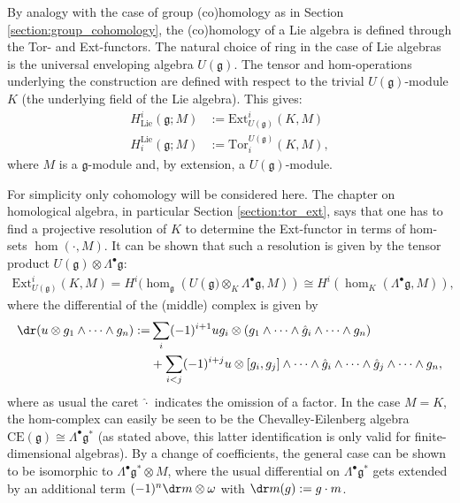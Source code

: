     By analogy with the case of group (co)homology as in Section \ref{section:group_cohomology}, the (co)homology of a Lie algebra is defined through the Tor- and Ext-functors. The natural choice of ring in the case of Lie algebras is the universal enveloping algebra $U(\mathfrak{g})$. The tensor and hom-operations underlying the construction are defined with respect to the trivial $U(\mathfrak{g})$-module $K$ (the underlying field of the Lie algebra). This gives:
    \begin{align}
        H^i_\mathrm{Lie}(\mathfrak{g};M) &:= \mathrm{Ext}^i_{U(\mathfrak{g})}(K,M)\\
        H_i^\mathrm{Lie}(\mathfrak{g};M) &:= \mathrm{Tor}_i^{U(\mathfrak{g})}(K,M),
    \end{align}
    where $M$ is a $\mathfrak{g}$-module and, by extension, a $U(\mathfrak{g})$-module.

    For simplicity only cohomology will be considered here. The chapter on homological algebra, in particular Section \ref{section:tor_ext}, says that one has to find a projective resolution of $K$ to determine the Ext-functor in terms of hom-sets $\hom(\cdot, M)$. It can be shown that such a resolution is given by the tensor product $U(\mathfrak{g})\otimes\Lambda^\bullet\mathfrak{g}$:
    \begin{gather}
        \mathrm{Ext}^i_{U(\mathfrak{g})}(K,M) = H^i(\hom_\mathfrak{g}(U(\mathfrak{g)}\otimes_K\Lambda^\bullet\mathfrak{g},M))\cong H^i(\hom_K(\Lambda^\bullet\mathfrak{g},M)),
    \end{gather}
    where the differential of the (middle) complex is given by
    \begin{align}
        \dr(u\otimes g_1\wedge\cdots\wedge g_n) := &\sum_i(-1)^{i+1}ug_i\otimes(g_1\wedge\cdots\wedge\hat{g}_i\wedge\cdots\wedge g_n)\\
        &+\sum_{i<j}(-1)^{i+j}u\otimes[g_i,g_j]\wedge\cdots\wedge\hat{g}_i\wedge\cdots\wedge\hat{g}_j\wedge\cdots\wedge g_n\nonumber,
    \end{align}
    where as usual the caret $\hat\cdot$ indicates the omission of a factor. In the case $M=K$, the hom-complex can easily be seen to be the Chevalley-Eilenberg algebra $\mathrm{CE}(\mathfrak{g})\cong\Lambda^\bullet\mathfrak{g}^*$ (as stated above, this latter identification is only valid for finite-dimensional algebras). By a change of coefficients, the general case can be shown to be isomorphic to $\Lambda^\bullet\mathfrak{g}^*\otimes M$, where the usual differential on $\Lambda^\bullet\mathfrak{g}^*$ gets extended by an additional term $(-1)^n\dr m\otimes\omega$ with $\dr m(g):=g\cdot m$.

